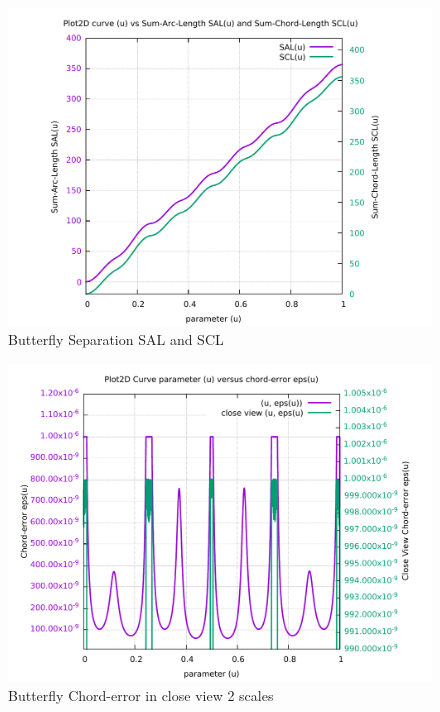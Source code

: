 \begin{figure}
	\caption     {Butterfly Separation SAL and SCL}
	\label{08-img-Butterfly-Separation-SAL-and-SCL.pdf}
\includegraphics[width=1.00\textwidth]{Chap4/appendix/app-Butterfly/plots/08-img-Butterfly-Separation-SAL-and-SCL.pdf}
\end{figure}

\clearpage
\pagebreak

\begin{figure}
	\caption     {Butterfly Chord-error in close view 2 scales}
	\label{09-img-Butterfly-Chord-error-in-close-view-2-scales.pdf}
\includegraphics[width=1.00\textwidth]{Chap4/appendix/app-Butterfly/plots/09-img-Butterfly-Chord-error-in-close-view-2-scales.pdf}
\end{figure}

